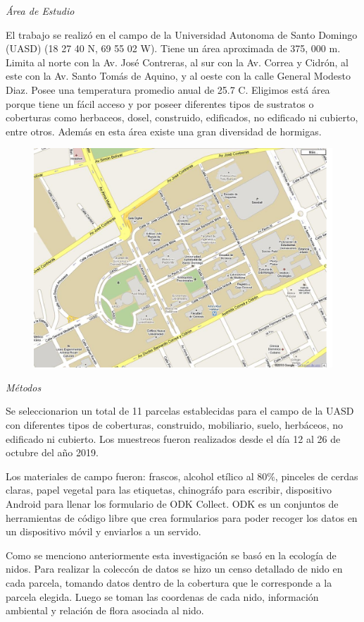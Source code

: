 \documentclass[11pt,]{article}
\begin{document}
\emph{Área de Estudio}

El trabajo se realizó en el campo de la Universidad Autonoma de Santo
Domingo (UASD) (18 27 40 N, 69 55 02 W). Tiene un área aproximada de
375, 000 m. Limita al norte con la Av. José Contreras, al sur con la Av.
Correa y Cidrón, al este con la Av. Santo Tomás de Aquino, y al oeste
con la calle General Modesto Diaz. Posee una temperatura promedio anual
de 25.7 C. Eligimos está área porque tiene un fácil acceso y por poseer
diferentes tipos de sustratos o coberturas como herbaceos, dosel,
construido, edificados, no edificado ni cubierto, entre otros. Además en
esta área existe una gran diversidad de hormigas.

\begin{figure}
\centering
\includegraphics{uasd.jpg}
\caption{}
\end{figure}

\emph{Métodos}

Se seleccionarion un total de 11 parcelas establecidas para el campo de
la UASD con diferentes tipos de coberturas, construido, mobiliario,
suelo, herbáceos, no edificado ni cubierto. Los muestreos fueron
realizados desde el día 12 al 26 de octubre del año 2019.

Los materiales de campo fueron: frascos, alcohol etílico al 80\%,
pinceles de cerdas claras, papel vegetal para las etiquetas, chinográfo
para escribir, dispositivo Android para llenar los formulario de ODK
Collect. ODK es un conjuntos de herramientas de código libre que crea
formularios para poder recoger los datos en un dispositivo móvil y
enviarlos a un servido.

Como se menciono anteriormente esta investigación se basó en la ecología
de nidos. Para realizar la coleccón de datos se hizo un censo detallado
de nido en cada parcela, tomando datos dentro de la cobertura que le
corresponde a la parcela elegida. Luego se toman las coordenas de cada
nido, información ambiental y relación de flora asociada al nido.
\end{document}
